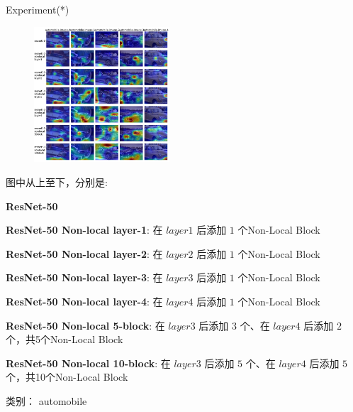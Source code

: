 \begin{frame}{Experiment(*)}
    \begin{multicols}{2}
        \begin{figure}
            \centering
            \includegraphics[width=0.45\textwidth]{docs/paperReading/Non-local/exp/automobile.png}
        \end{figure}

        \begin{scriptsize}
            图中从上至下，分别是:

            \begin{tiny}
                \textbf{ResNet-50}

                \textbf{ResNet-50 Non-local layer-1}: 在 $layer1$ 后添加 $1$ 个Non-Local Block

                \textbf{ResNet-50 Non-local layer-2}: 在 $layer2$ 后添加 $1$ 个Non-Local Block

                \textbf{ResNet-50 Non-local layer-3}: 在 $layer3$ 后添加 $1$ 个Non-Local Block
                
                \textbf{ResNet-50 Non-local layer-4}: 在 $layer4$ 后添加 $1$ 个Non-Local Block
                
                \textbf{ResNet-50 Non-local 5-block}: 在 $layer3$ 后添加 $3$ 个、在 $layer4$ 后添加 $2$ 个，共5个Non-Local Block
                
                \textbf{ResNet-50 Non-local 10-block}: 在 $layer3$ 后添加 $5$ 个、在 $layer4$ 后添加 $5$ 个，共10个Non-Local Block
            \end{tiny}

            类别： automobile 
        \end{scriptsize}
    \end{multicols}
\end{frame}
